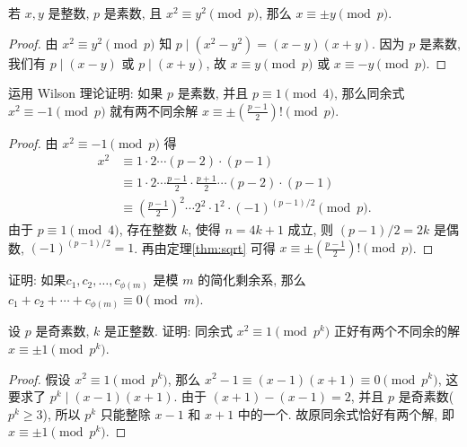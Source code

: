 \documentclass[a5paper,fleqn,10pt]{article}
\begin{document}
\begin{thm}\label{thm:sqrt}
	若 $x,y$ 是整数, $p$ 是素数, 且 $x^2\equiv y^2\pmod p$, 那么 $x\equiv\pm y\pmod p$.
\end{thm}
\begin{proof}
	由 $x^2\equiv y^2\pmod p$ 知 $p\mid(x^2-y^2)=(x-y)(x+y)$. 因为 $p$ 是素数, 我们有 $p\mid(x-y)$ 或 $p\mid(x+y)$,
	故 $x\equiv y\pmod p$ 或 $x\equiv -y\pmod p$.
\end{proof}

\begin{exmp}
	运用 Wilson 理论证明: 如果 $p$ 是素数, 并且 $p\equiv 1\pmod 4$, 那么同余式 $x^2\equiv -1\pmod p$ 就有两不同余解
	$x\equiv\pm\left(\frac{p-1}{2}\right)!\pmod p$.
\end{exmp}
\begin{proof}
	由 $x^2\equiv -1\pmod p$ 得
	\begin{align*}
		x^2 & \equiv 1\cdot 2\cdots(p-2)\cdot(p-1)                                              \\
		    & \equiv 1\cdot 2\cdots\frac{p-1}{2}\cdot\frac{p+1}{2}\cdots(p-2)\cdot(p-1)         \\
		    & \equiv \left(\frac{p-1}{2}\right)^2\cdots 2^2\cdot 1^2\cdot(-1)^{(p-1)/2}\pmod p.
	\end{align*}
	由于 $p\equiv 1\pmod 4$, 存在整数 $k$, 使得 $n=4k+1$ 成立, 则 $(p-1)/2=2k$ 是偶数, $(-1)^{(p-1)/2}=1$.
	再由定理\ref{thm:sqrt} 可得 $x\equiv\pm\left(\frac{p-1}{2}\right)!\pmod p$.
\end{proof}

\begin{exmp}
	证明: 如果$c_1,c_2,\ldots,c_{\phi(m)}$ 是模 $m$ 的简化剩余系, 那么 $c_1+c_2+\cdots+c_{\phi(m)}\equiv 0\pmod m$.
\end{exmp}

\begin{exmp}
	设 $p$ 是奇素数, $k$ 是正整数. 证明: 同余式 $x^2\equiv 1\pmod{p^k}$ 正好有两个不同余的解 $x\equiv\pm 1\pmod{p^k}$.
\end{exmp}
\begin{proof}
	假设 $x^2\equiv 1\pmod{p^k}$, 那么 $x^2-1\equiv(x-1)(x+1)\equiv 0\pmod{p^k}$, 这要求了 $p^k\mid(x-1)(x+1)$.
	由于 $(x+1)-(x-1)=2$, 并且 $p$ 是奇素数($p^k\geq 3$), 所以 $p^k$ 只能整除 $x-1$ 和 $x+1$ 中的一个.
	故原同余式恰好有两个解, 即 $x\equiv\pm 1\pmod{p^k}$.
\end{proof}
\end{document}
